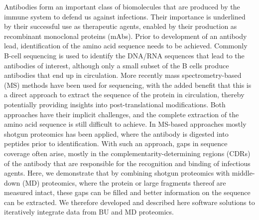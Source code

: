\begin{abstract102}
  Antibodies form an important class of biomolecules that are produced by the immune system to defend us against infections. Their importance is underlined by their successful use as therapeutic agents, enabled by their production as recombinant monoclonal proteins (mAbs). Prior to development of an antibody lead, identification of the amino acid sequence needs to be achieved. Commonly B-cell sequencing is used to identify the DNA/RNA sequences that lead to the antibodies of interest, although only a small subset of the B cells produce antibodies that end up in circulation. More recently mass spectrometry-based (MS) methods have been used for sequencing, with the added benefit that this is a direct approach to extract the sequence of the protein in circulation, thereby potentially providing insights into post-translational modifications. Both approaches have their implicit challenges, and the complete extraction of the amino acid sequence is still difficult to achieve. In MS-based approaches mostly shotgun proteomics has been applied, where the antibody is digested into peptides prior to identification. With such an approach, gaps in sequence coverage often arise, mostly in the complementarity-determining regions (CDRs) of the antibody that are responsible for the recognition and binding of infectious agents. Here, we demonstrate that by combining shotgun proteomics with middle-down (MD) proteomics, where the protein or large fragments thereof are measured intact, these gaps can be filled and better information on the sequence can be extracted. We therefore developed and described here software solutions to iteratively integrate data from BU and MD proteomics.
\end{abstract102}
\thumbforchapter

